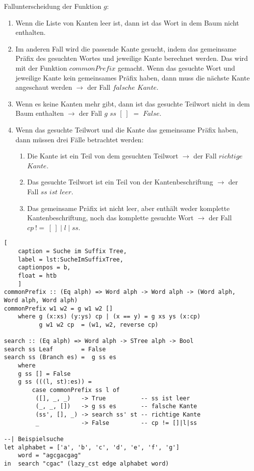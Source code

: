 \documentclass[12pt]{report}
\begin{document}
Fallunterscheidung der Funktion $g$:
\begin{enumerate}
    \item Wenn die Liste von Kanten leer ist, dann ist das Wort in dem Baum nicht enthalten.
    \item Im anderen Fall wird die passende Kante gesucht, indem das gemeinsame Präfix des gesuchten Wortes und jeweilige Kante berechnet werden. Das wird mit der Funktion $commonPrefix$ gemacht. Wenn das gesuchte Wort und jeweilige Kante kein gemeinsames Präfix haben, dann muss die nächste Kante angeschaut werden $\rightarrow$ der Fall $falsche$ $Kante$.
    \item Wenn es keine Kanten mehr gibt, dann ist das gesuchte Teilwort nicht in dem Baum enthalten $\rightarrow$ der Fall $g$ $ss$ $[\:]$ $=$ $False$.
    \item Wenn das gesuchte Teilwort und die Kante das gemeinsame Präfix haben, dann müssen drei Fälle betrachtet werden:
    \begin{enumerate}
        \item Die Kante ist ein Teil von dem gesuchten Teilwort $\rightarrow$ der Fall $richtige$ $Kante$.
        \item Das gesuchte Teilwort ist ein Teil von der Kantenbeschriftung $\rightarrow$ der Fall $ss$ $ist$ $leer$.
        \item Das gemeinsame Präfix ist nicht leer, aber enthält weder komplette Kantenbeschriftung, noch das komplette gesuchte Wort $\rightarrow$ der Fall $cp\:!=\:[\:]\mid l \mid ss$.
    \end{enumerate}
\end{enumerate}

\begin{lstlisting}[
    caption = Suche im Suffix Tree,
    label = lst:SucheImSuffixTree,
    captionpos = b,
    float = htb
    ]
commonPrefix :: (Eq alph) => Word alph -> Word alph -> (Word alph, Word alph, Word alph)
commonPrefix w1 w2 = g w1 w2 []
    where g (x:xs) (y:ys) cp | (x == y) = g xs ys (x:cp)
          g w1 w2 cp  = (w1, w2, reverse cp)

search :: (Eq alph) => Word alph -> STree alph -> Bool
search ss Leaf        = False
search ss (Branch es) =  g ss es
    where
    g ss [] = False
    g ss (((l, st):es)) =
        case commonPrefix ss l of
         ([], _, _)   -> True          -- ss ist leer
         (_, _, [])   -> g ss es       -- falsche Kante
         (ss', [], _) -> search ss' st -- richtige Kante
         _            -> False         -- cp != []|l|ss

--| Beispielsuche
let alphabet = ['a', 'b', 'c', 'd', 'e', 'f', 'g']
    word = "agcgacgag"
in  search "cgac" (lazy_cst edge alphabet word)
\end{lstlisting}
\end{document}
